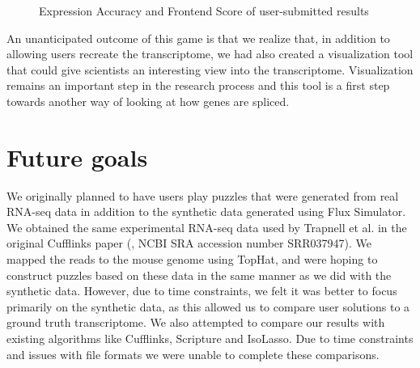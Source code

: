 \documentclass[12pt]{article}
\begin{document}
\begin{figure}[H]
\centering
{}
\caption{Expression Accuracy and Frontend Score of user-submitted results}\label{fig:score}
\end{figure}

An unanticipated outcome of this game is that we realize that, in addition to allowing users recreate the transcriptome, we had also created a visualization tool that could give scientists an interesting view into the transcriptome. Visualization remains an important step in the research process and this tool is a first step towards another way of looking at how genes are spliced.

\section*{Future goals}

We originally planned to have users play puzzles that were generated from real RNA-seq data in addition to the synthetic data generated using Flux Simulator.
We obtained the same experimental RNA-seq data used by Trapnell et al. in the original Cufflinks paper (\cite{trapnell2010transcript}, NCBI SRA accession number SRR037947). We mapped the reads to 
the mouse genome using TopHat, and were hoping to construct puzzles based on these data in the same manner as we did with the synthetic data. However, due
to time constraints, we felt it was better to focus primarily on the synthetic data, as this allowed us to compare user solutions to a ground truth transcriptome. We also attempted to compare our results with existing algorithms like Cufflinks, Scripture and IsoLasso. Due to time constraints and issues with file formats we were unable to complete these comparisons.
\end{document}
